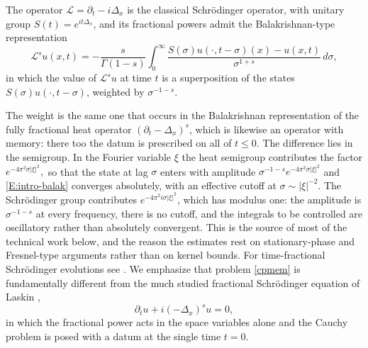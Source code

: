 \documentclass[11pt,letter]{amsart}
\def \G{\Gamma}
\newcommand{\p}{\partial}
\numberwithin{equation}{section}
\newcommand{\Le}{\mathcal L}
\numberwithin{equation}{section}
\begin{document}
The operator $\mathcal L=\partial_t-i\Delta_x$ is the classical Schr\"odinger
operator, with unitary group $S(t)=e^{it\Delta_x}$, and its fractional powers
admit the Balakrishnan-type representation
\begin{equation}\label{E:intro-balak}
\Le^su(x,t)
=-\frac{s}{\G(1-s)}\int_0^\infty
\frac{S(\sigma)u(\cdot,t-\sigma)(x)-u(x,t)}{\sigma^{1+s}}\,d\sigma ,
\end{equation}
in which the value of $\Le^su$ at time $t$ is a superposition of the states
$S(\sigma)u(\cdot,t-\sigma)$, weighted by $\sigma^{-1-s}$.

The weight is the same one that occurs in the Balakrishnan representation of the
fully fractional heat operator $(\p_t-\Delta_x)^s$, which is likewise an
operator with memory: there too the datum is prescribed on all of $t\le0$. The
difference lies in the semigroup. In the Fourier variable $\xi$ the heat
semigroup contributes the factor $e^{-4\pi^2\sigma|\xi|^2},$ so that the state
at lag $\sigma$ enters with amplitude $\sigma^{-1-s}e^{-4\pi^2\sigma|\xi|^2}$
and \eqref{E:intro-balak} converges absolutely, with an effective cutoff at
$\sigma\sim|\xi|^{-2}$. The Schr\"odinger group contributes
$e^{-4\pi^2i\sigma|\xi|^2}$, which has modulus one: the amplitude is $\sigma^{-1-s}$ at
every frequency, there is no cutoff, and the integrals to be controlled are
oscillatory rather than absolutely convergent. This is the source of most of the
technical work below, and the reason the estimates rest on stationary-phase and
Fresnel-type arguments rather than on kernel bounds. For time-fractional
Schr\"odinger evolutions see \cite{Naber}. We emphasize that problem
\eqref{cpmem} is
fundamentally different from the much studied fractional Schr\"odinger equation
of Laskin \cite{Laskin},
\[
\partial_t u + i(-\Delta_x)^s u = 0,
\]
in which the fractional power acts in the space variables alone and the Cauchy
problem is posed with a datum at the single time $t=0$.
\end{document}

